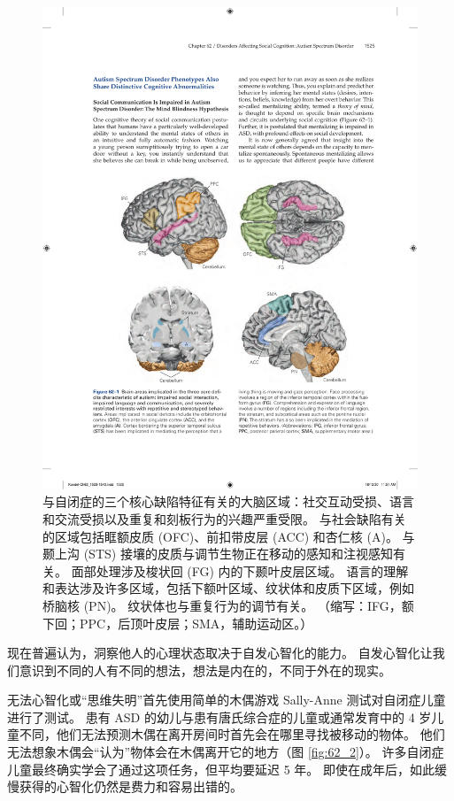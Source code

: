 \begin{figure}[htbp]
	\centering
	\includegraphics[width=0.8\linewidth]{chap62/fig_62_1}
	\caption{与自闭症的三个核心缺陷特征有关的大脑区域：社交互动受损、语言和交流受损以及重复和刻板行为的兴趣严重受限。 与社会缺陷有关的区域包括眶额皮质 (OFC)、前扣带皮层 (ACC) 和杏仁核 (A)。 与颞上沟 (STS) 接壤的皮质与调节生物正在移动的感知和注视感知有关。 面部处理涉及梭状回 (FG) 内的下颞叶皮层区域。 语言的理解和表达涉及许多区域，包括下额叶区域、纹状体和皮质下区域，例如桥脑核 (PN)。 纹状体也与重复行为的调节有关。 （缩写：IFG，额下回；PPC，后顶叶皮层；SMA，辅助运动区。）}
	\label{fig:62_1}
\end{figure}


现在普遍认为，洞察他人的心理状态取决于自发心智化的能力。
自发心智化让我们意识到不同的人有不同的想法，想法是内在的，不同于外在的现实。


无法心智化或“思维失明”首先使用简单的木偶游戏 Sally-Anne 测试对自闭症儿童进行了测试。
患有 ASD 的幼儿与患有唐氏综合症的儿童或通常发育中的 4 岁儿童不同，他们无法预测木偶在离开房间时首先会在哪里寻找被移动的物体。
他们无法想象木偶会“认为”物体会在木偶离开它的地方（图 \ref{fig:62_2}）。
许多自闭症儿童最终确实学会了通过这项任务，但平均要延迟 5 年。
即使在成年后，如此缓慢获得的心智化仍然是费力和容易出错的。


